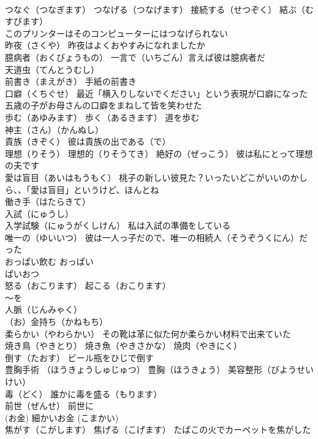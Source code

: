 \documentclass[8pt]{extreport}
\begin{document}
\begin{CJK}{UTF8}{min}
\\	つなぐ（つなぎます） つなげる（つなげます） 接続する（せつぞく） 結ぶ（むすびます）
\\	このプリンターはそのコンピューターにはつなげられない
\\	昨夜（さくや） 昨夜はよくおやすみになれましたか
\\	臆病者（おくびょうもの） 一言で（いちごん）言えば彼は臆病者だ
\\	天道虫（てんとうむし）
\\	前書き（まえがき） 手紙の前書き
\\	口癖（くちぐせ） 最近「横入りしないでください」という表現が口癖になった 五歳の子がお母さんの口癖をまねして皆を笑わせた
\\	歩む（あゆみます） 歩く（あるきます） 道を歩む
\\	神主（さん）（かんぬし）
\\	貴族（きぞく） 彼は貴族の出である（で）
\\	理想（りそう） 理想的（りそうてき） 絶好の（ぜっこう） 彼は私にとって理想の夫です
\\	愛は盲目（あいはもうもく） 桃子の新しい彼見た？いったいどこがいいのかしら、、「愛は盲目」というけど、ほんとね
\\	働き手（はたらきて）
\\	入試（にゅうし） 
\\	入学試験（にゅうがくしけん） 私は入試の準備をしている
\\	唯一の（ゆいいつ） 彼は一人っ子だので、唯一の相続人（そうぞうくにん）だった
\\	おっぱい飲む おっぱい 
\\	ぱいおつ
\\	怒る（おこります） 起こる（おこります）
\\	～を
\\	人脈（じんみゃく）
\\	（お）金持ち（かねもち）
\\	柔らかい（やわらかい） その靴は革に似た何か柔らかい材料で出来ていた
\\	焼き鳥（やきとり） 焼き魚（やきさかな） 焼肉（やきにく）
\\	倒す（たおす） ビール瓶をひじで倒す
\\	豊胸手術 （ほうきょうしゅじゅつ） 豊胸（ほうきょう） 美容整形（びようせいけい）
\\	毒（どく） 誰かに毒を盛る（もります）
\\	前世（ぜんせ） 前世に
\\	(お金)	細かいお金 (こまかい)
\\	焦がす（こがします） 焦げる（こげます） たばこの火でカーペットを焦がした

\end{CJK}
\end{document}
